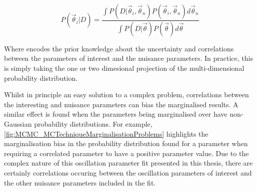 \begin{equation}
P(\vec{\theta}_{i}|D) = \frac{\int P(D|\vec{\theta}_{i},\vec{\theta}_{n}) P(\vec{\theta}_{i},\vec{\theta}_{n}) d\vec{\theta}_{n}}{\int P(D|\vec{\theta}) P(\vec{\theta}) d\vec{\theta}}
\end{equation}

Where  encodes the prior knowledge about the uncertainty and correlations between the parameters of interest and the nuisance parameters. In practice, this is simply taking the one or two dimesional projection of the multi-dimensional probability distribution.

Whilst in principle an easy solution to a complex problem, correlations between the interesting and nuisance parameters can bias the marginalised results. A similar effect is found when the parameters being marginalised over have non-Gaussian probability distributions. For example, \autoref{fig:MCMC_MCTechniqueMarginalisationProblems} highlights the marginalisation bias in the probability distribution found for a parameter when requiring a correlated parameter to have a positive parameter value. Due to the complex nature of this oscillation parameter fit presented in this thesis, there are certainly correlations occuring between the oscillation parameters of interest and the other nuisance parameters included in the fit.

